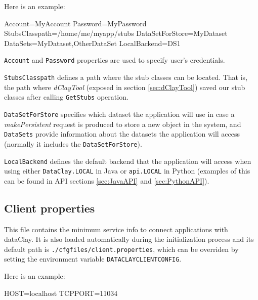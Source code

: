 Here is an example:

\begin{tBox}
 \begin{bash}
  Account=MyAccount
  Password=MyPassword
  StubsClasspath=/home/me/myapp/stubs
  DataSetForStore=MyDataset
  DataSets=MyDataset,OtherDataSet
  LocalBackend=DS1
 \end{bash}
\end{tBox}

\texttt{Account} and \texttt{Password} properties are used to specify user's credentials. 

\texttt{StubsClasspath} defines a path where the stub classes can be located. That is, the path where \textit{dClayTool} (exposed in section \ref{sec:dClayTool}) saved our stub classes after calling \texttt{GetStubs} operation.

\texttt{DataSetForStore} specifies which dataset the application will use in case a \textit{makePersistent} request is produced to store a new object in the system, and \texttt{DataSets} provide information about the datasets the application will access (normally it includes the \texttt{DataSetForStore}). 

\texttt{LocalBackend} defines the default backend that the application will access when using either \texttt{DataClay.LOCAL} in Java or \texttt{api.LOCAL} in Python (examples of this can be found in API sections \ref{sec:JavaAPI} and \ref{sec:PythonAPI}). 


\subsection{Client properties}
This file contains the minimum service info to connect applications with dataClay. It is also loaded automatically during the initialization process and its default path is \texttt{./cfgfiles/client.properties}, which can be overriden by setting the environment variable \texttt{DATACLAYCLIENTCONFIG}.

Here is an example:

\begin{tBox}
 \begin{bash}
 HOST=localhost
 TCPPORT=11034
 \end{bash}
\end{tBox}

